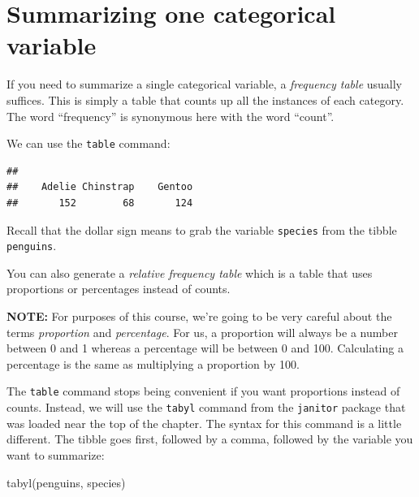 \documentclass[
]{book}
\newenvironment{Shaded}{\begin{snugshade}}{\end{snugshade}}
\newcommand{\FunctionTok}[1]{\textcolor[rgb]{0.00,0.00,0.00}{#1}}
\newcommand{\NormalTok}[1]{#1}
\newcommand{\SpecialCharTok}[1]{\textcolor[rgb]{0.00,0.00,0.00}{#1}}
\begin{document}
\hypertarget{categorical-summarizing-one}{%
\section{Summarizing one categorical variable}\label{categorical-summarizing-one}}

If you need to summarize a single categorical variable, a \emph{frequency table} usually suffices. This is simply a table that counts up all the instances of each category. The word ``frequency'' is synonymous here with the word ``count''.

We can use the \texttt{table} command:

\begin{Shaded}
\end{Shaded}

\begin{verbatim}
## 
##    Adelie Chinstrap    Gentoo 
##       152        68       124
\end{verbatim}

Recall that the dollar sign means to grab the variable \texttt{species} from the tibble \texttt{penguins}.

You can also generate a \emph{relative frequency table} which is a table that uses proportions or percentages instead of counts.

\textbf{NOTE:} For purposes of this course, we're going to be very careful about the terms \emph{proportion} and \emph{percentage}. For us, a proportion will always be a number between 0 and 1 whereas a percentage will be between 0 and 100. Calculating a percentage is the same as multiplying a proportion by 100.

The \texttt{table} command stops being convenient if you want proportions instead of counts. Instead, we will use the \texttt{tabyl} command from the \texttt{janitor} package that was loaded near the top of the chapter. The syntax for this command is a little different. The tibble goes first, followed by a comma, followed by the variable you want to summarize:

\begin{Shaded}
\begin{Highlighting}[]
\FunctionTok{tabyl}\NormalTok{(penguins, species)}
\end{Highlighting}
\end{Shaded}
\end{document}
